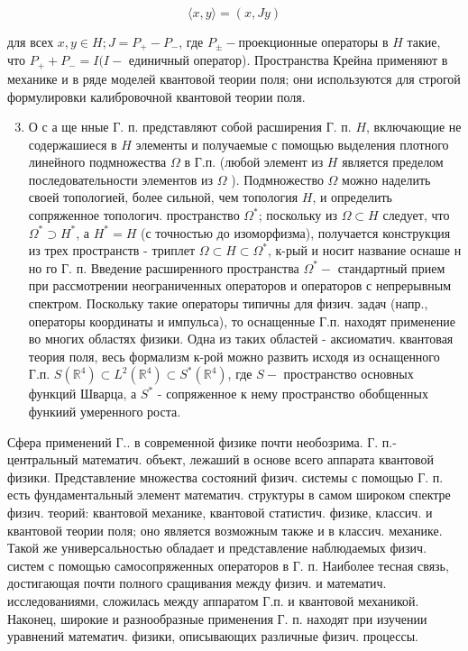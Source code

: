 \documentclass[10pt]{article}
\begin{document}
\[

\langle x, y\rangle=(x, J y)

\]



для всех $x, y \in H ; J=P_{+}-P_{-}$, где $P_{ \pm}-$проекционные операторы в $H$ такие, что $P_{+}+P_{-}=I(I-$ единичный оператор). Пространства Крейна применяют в механике и в ряде моделей квантовой теории поля; они используются для строгой формулировки калибровочной квантовой теории поля.



\begin{enumerate}

  \setcounter{enumi}{2}

  \item О с а ще нные Г. п. представляют собой расширения Г. п. $H$, включающие не содержашиеся в $H$ элементы и получаемые с помощью выделения плотного линейного подмножества $\Omega$ в Г.п. (любой элемент из $H$ является пределом последовательности элементов из $\Omega$ ). Подмножество $\Omega$ можно наделить своей топологией, более сильной, чем топология $H$, и определить сопряженное топологич. пространство $\Omega^{*}$; поскольку из $\Omega \subset H$ следует, что $\Omega^{*} \supset H^{*}$, а $H^{*}=H$ (с точностью до изоморфизма), получается конструкция из трех пространств - триплет $\Omega \subset H \subset \Omega^{*}$, к-рый и носит название оснаше н но го Г. п. Введение расширенного пространства $\Omega^{*}-$ стандартный прием при рассмотрении неограниченных операторов и операторов с непрерывным спектром. Поскольку такие операторы типичны для физич. задач (напр., операторы координаты и импульса), то оснащенные Г.п. находят применение во многих областях физики. Одна из таких областей - аксиоматич. квантовая теория поля, весь формализм к-рой можно развить исходя из оснащенного Г.п. $S\left(\mathbb{R}^{4}\right) \subset L^{2}\left(\mathbb{R}^{4}\right) \subset S^{*}\left(\mathbb{R}^{4}\right)$, где $S-$ пространство основных функций Шварца, а $S^{*}$ - сопряженное к нему пространство обобщенных функиий умеренного роста.

\end{enumerate}



Сфера применений Г.. в современной физике почти необозрима. Г. п.- центральный математич. объект, лежаший в основе всего аппарата квантовой физики. Представление множества состояний физич. системы с помощью Г. п. есть фундаментальный элемент математич. структуры в самом широком спектре физич. теорий: квантовой механике, квантовой статистич. физике, классич. и квантовой теории поля; оно является возможным также и в классич. механике. Такой же универсальностью обладает и представление наблюдаемых физич. систем с помощью самосопряженных операторов в Г. п. Наиболее тесная связь, достигающая почти полного сращивания между физич. и математич. исследованиями, сложилась между аппаратом Г.п. и квантовой механикой. Наконец, широкие и разнообразные применения Г. п. находят при изучении уравнений математич. физики, описывающих различные физич. процессы.
\end{document}
